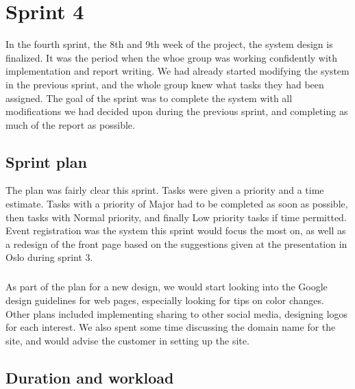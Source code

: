 \chapter{Sprint 4}
\label{chap:S5}

In the fourth sprint, the 8th and 9th week of the project, the system design is finalized. It was the period when the whoe group was working confidently with implementation and report writing. We had already started modifying the system in the previous sprint, and the whole group knew what tasks they had been assigned. The goal of the sprint was to complete the system with all modifications we had decided upon during the previous sprint, and completing as much of the report as possible.

\section{Sprint plan}
\label{sec:S5Plan}

The plan was fairly clear this sprint. Tasks were given a priority and a time estimate. Tasks with a priority of Major had to be completed as soon as possible, then tasks with Normal priority, and finally Low priority tasks if time permitted. Event registration was the system this sprint would focus the most on, as well as a redesign of the front page based on the suggestions given at the presentation in Oslo during sprint 3.

\paragraph{} As part of the plan for a new design, we would start looking into the Google design guidelines for web pages, especially looking for tips on color changes. Other plans included implementing sharing to other social media, designing logos for each interest. We also spent some time discussing the domain name for the site, and would advise the customer in setting up the site.

\section{Duration and workload}
\label{sec:S5Duration}

